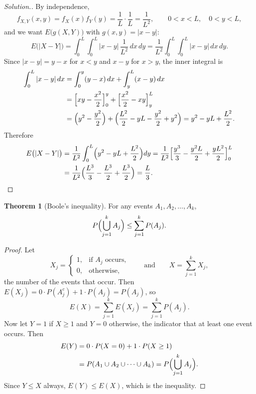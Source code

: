 \documentclass[11pt,a4paper]{article}
\theoremstyle{definition}
\newtheorem{thm}{Theorem}[subsection]
\newenvironment{solution}
  {\renewcommand{\qedsymbol}{}\begin{proof}[\textit{Solution}.]}
  {\end{proof}}
\begin{document}
\begin{solution}
By independence,
\[
f_{X,Y}(x, y) = f_X(x)f_Y(y) = \frac1L\cdot\frac1L = \frac{1}{L^2} , \qquad 0 < x < L , \quad 0 < y < L ,
\]
and we want $E\bigl(g(X, Y)\bigr)$ with $g(x, y) = |x - y|$:
\[
E\bigl(|X - Y|\bigr) = \int_0^L\int_0^L|x - y|\,\frac{1}{L^2}\,dx\,dy = \frac{1}{L^2}\int_0^L\int_0^L|x - y|\,dx\,dy .
\]
Since $|x - y| = y - x$ for $x < y$ and $x - y$ for $x > y$, the inner integral is
\begin{align*}
\int_0^L|x - y|\,dx &= \int_0^y(y - x)\,dx + \int_y^L(x - y)\,dx \\
&= \Bigl[xy - \frac{x^2}{2}\Bigr]_0^y + \Bigl[\frac{x^2}{2} - xy\Bigr]_y^L \\
&= \Bigl(y^2 - \frac{y^2}{2}\Bigr) + \Bigl(\frac{L^2}{2} - yL - \frac{y^2}{2} + y^2\Bigr) = y^2 - yL + \frac{L^2}{2} .
\end{align*}
Therefore
\begin{align*}
E\bigl(|X - Y|\bigr) &= \frac{1}{L^2}\int_0^L\Bigl(y^2 - yL + \frac{L^2}{2}\Bigr)dy = \frac{1}{L^2}\Bigl[\frac{y^3}{3} - \frac{y^2L}{2} + \frac{yL^2}{2}\Bigr]_0^L \\
&= \frac{1}{L^2}\Bigl(\frac{L^3}{3} - \frac{L^3}{2} + \frac{L^3}{2}\Bigr) = \frac L3 .
\end{align*}
\end{solution}

\begin{thm}[Boole's inequality]\label{thm:boole}
For any events $A_1, A_2, \dots, A_k$,
\[
P\Bigl(\bigcup_{j=1}^kA_j\Bigr) \le \sum_{j=1}^kP(A_j) .
\]
\end{thm}

\begin{proof}
Let
\[
X_j = \begin{cases} 1 , & \text{if } A_j \text{ occurs} , \\ 0 , & \text{otherwise} , \end{cases} \qquad\text{and}\qquad X = \sum_{j=1}^kX_j ,
\]
the number of the events that occur. Then $E(X_j) = 0 \cdot P(A_j^c) + 1 \cdot P(A_j) = P(A_j)$, so
\[
E(X) = \sum_{j=1}^kE(X_j) = \sum_{j=1}^kP(A_j) .
\]
Now let $Y = 1$ if $X \ge 1$ and $Y = 0$ otherwise, the indicator that at least one event occurs. Then
\begin{align*}
E(Y) &= 0 \cdot P(X = 0) + 1 \cdot P(X \ge 1) \\
&= P(A_1 \cup A_2 \cup \dots \cup A_k) = P\Bigl(\bigcup_{j=1}^kA_j\Bigr) .
\end{align*}
Since $Y \le X$ always, $E(Y) \le E(X)$, which is the inequality.
\end{proof}
\end{document}
